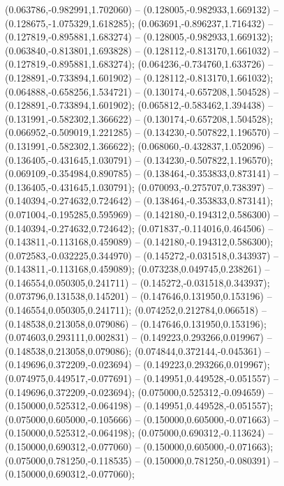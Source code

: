  (0.063786,-0.982991,1.702060) -- (0.128005,-0.982933,1.669132) -- (0.128675,-1.075329,1.618285);
 (0.063691,-0.896237,1.716432) -- (0.127819,-0.895881,1.683274) -- (0.128005,-0.982933,1.669132);
 (0.063840,-0.813801,1.693828) -- (0.128112,-0.813170,1.661032) -- (0.127819,-0.895881,1.683274);
 (0.064236,-0.734760,1.633726) -- (0.128891,-0.733894,1.601902) -- (0.128112,-0.813170,1.661032);
 (0.064888,-0.658256,1.534721) -- (0.130174,-0.657208,1.504528) -- (0.128891,-0.733894,1.601902);
 (0.065812,-0.583462,1.394438) -- (0.131991,-0.582302,1.366622) -- (0.130174,-0.657208,1.504528);
 (0.066952,-0.509019,1.221285) -- (0.134230,-0.507822,1.196570) -- (0.131991,-0.582302,1.366622);
 (0.068060,-0.432837,1.052096) -- (0.136405,-0.431645,1.030791) -- (0.134230,-0.507822,1.196570);
 (0.069109,-0.354984,0.890785) -- (0.138464,-0.353833,0.873141) -- (0.136405,-0.431645,1.030791);
 (0.070093,-0.275707,0.738397) -- (0.140394,-0.274632,0.724642) -- (0.138464,-0.353833,0.873141);
 (0.071004,-0.195285,0.595969) -- (0.142180,-0.194312,0.586300) -- (0.140394,-0.274632,0.724642);
 (0.071837,-0.114016,0.464506) -- (0.143811,-0.113168,0.459089) -- (0.142180,-0.194312,0.586300);
 (0.072583,-0.032225,0.344970) -- (0.145272,-0.031518,0.343937) -- (0.143811,-0.113168,0.459089);
 (0.073238,0.049745,0.238261) -- (0.146554,0.050305,0.241711) -- (0.145272,-0.031518,0.343937);
 (0.073796,0.131538,0.145201) -- (0.147646,0.131950,0.153196) -- (0.146554,0.050305,0.241711);
 (0.074252,0.212784,0.066518) -- (0.148538,0.213058,0.079086) -- (0.147646,0.131950,0.153196);
 (0.074603,0.293111,0.002831) -- (0.149223,0.293266,0.019967) -- (0.148538,0.213058,0.079086);
 (0.074844,0.372144,-0.045361) -- (0.149696,0.372209,-0.023694) -- (0.149223,0.293266,0.019967);
 (0.074975,0.449517,-0.077691) -- (0.149951,0.449528,-0.051557) -- (0.149696,0.372209,-0.023694);
 (0.075000,0.525312,-0.094659) -- (0.150000,0.525312,-0.064198) -- (0.149951,0.449528,-0.051557);
 (0.075000,0.605000,-0.105666) -- (0.150000,0.605000,-0.071663) -- (0.150000,0.525312,-0.064198);
 (0.075000,0.690312,-0.113624) -- (0.150000,0.690312,-0.077060) -- (0.150000,0.605000,-0.071663);
 (0.075000,0.781250,-0.118535) -- (0.150000,0.781250,-0.080391) -- (0.150000,0.690312,-0.077060);

